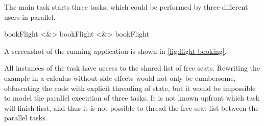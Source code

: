 \begin{example}
The main task starts three  tasks,
which could be performed by three different users in parallel.
\begin{TASK}
  bookFlight <&> bookFlight <&> bookFlight
\end{TASK}
A screenshot of the running application is shown in \cref{fig:flight-booking}.

All instances of the  task have access to the shared list of free seats.
Rewriting the example in a calculus without side effects would not only be cumbersome,
obfuscating the code with explicit threading of state,
but it would be impossible to model the parallel execution of three  tasks.
It is not known upfront which task will finish first,
and thus it is not possible to thread the free seat list between the parallel tasks.

\end{example}
